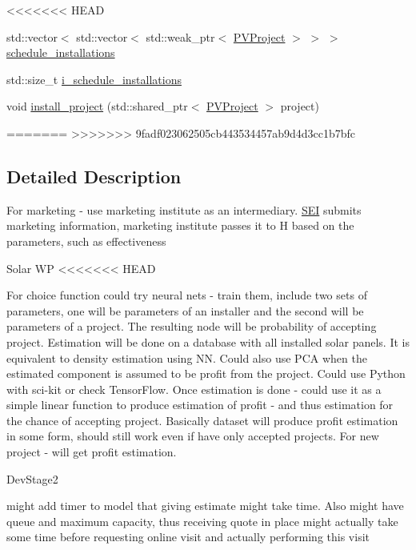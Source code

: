 <<<<<<< HEAD
\begin{DoxyCompactItemize}
\item 
std\+::vector$<$ std\+::vector$<$ std\+::weak\+\_\+ptr$<$ \hyperlink{classsolar__core_1_1_p_v_project}{P\+V\+Project} $>$ $>$ $>$ \hyperlink{classsolar__core_1_1_s_e_i_aacda4fae2c17d58672b60eba9c8cdc63}{schedule\+\_\+installations}
\item 
std\+::size\+\_\+t \hyperlink{classsolar__core_1_1_s_e_i_ad906dcd5b638e405a7daf14539096377}{i\+\_\+schedule\+\_\+installations}
\item 
void \hyperlink{classsolar__core_1_1_s_e_i_a1ab2217b83050e4320afa11c4d838fde}{install\+\_\+project} (std\+::shared\+\_\+ptr$<$ \hyperlink{classsolar__core_1_1_p_v_project}{P\+V\+Project} $>$ project)
\end{DoxyCompactItemize}
=======
>>>>>>> 9fadf023062505cb443534457ab9d4d3cc1b7bfc


\subsection{Detailed Description}
For marketing -\/ use marketing institute as an intermediary. \hyperlink{classsolar__core_1_1_s_e_i}{S\+E\+I} submits marketing information, marketing institute passes it to H based on the parameters, such as effectiveness

\begin{DoxyRefDesc}{Solar W\+P}
<<<<<<< HEAD
\item[\hyperlink{wp__wp000004}{Solar W\+P}]For choice function could try neural nets -\/ train them, include two sets of parameters, one will be parameters of an installer and the second will be parameters of a project. The resulting node will be probability of accepting project. Estimation will be done on a database with all installed solar panels. It is equivalent to density estimation using N\+N. Could also use P\+C\+A when the estimated component is assumed to be profit from the project. Could use Python with sci-\/kit or check Tensor\+Flow. Once estimation is done -\/ could use it as a simple linear function to produce estimation of profit -\/ and thus estimation for the chance of accepting project. Basically dataset will produce profit estimation in some form, should still work even if have only accepted projects. For new project -\/ will get profit estimation.\end{DoxyRefDesc}


\begin{DoxyRefDesc}{Dev\+Stage2}
\item[\hyperlink{_dev_stage2__DevStage2000017}{Dev\+Stage2}]might add timer to model that giving estimate might take time. Also might have queue and maximum capacity, thus receiving quote in place might actually take some time before requesting online visit and actually performing this visit\end{DoxyRefDesc}


